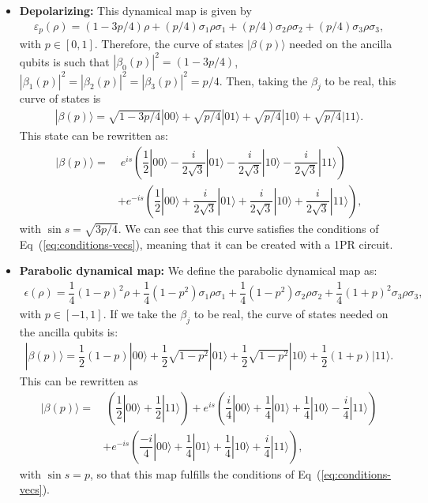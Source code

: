 \documentclass[10pt,letterpaper]{article} %
\newcommand{\eref}[1]{Eq~(\ref{#1})}
\begin{document}
\begin{itemize}
\item \textbf{Depolarizing:} This dynamical map is given by
\begin{align*}
\varepsilon_p(\rho) = (1-3p/4) \rho + (p/4) \sigma_1 \rho \sigma_1 + (p/4) \sigma_2 \rho \sigma_2 + (p/4) \sigma_3 \rho \sigma_3,
\end{align*}
with $p \in [0,1]$. 
Therefore, the curve of states $|\beta(p)\rangle$ needed on the ancilla
qubits is such that 
${|\beta_0(p)|}^2= (1-3p/4)$, ${|\beta_1(p)|}^2 = {|\beta_2(p)|}^2 = {|\beta_3(p)|}^2 = p/4$.
Then, taking the $\beta_j$ to be real,
this curve of states is 
\begin{align*}
|\beta(p) \rangle = \sqrt{1-3p/4} |00\rangle + \sqrt{p/4} |01\rangle + \sqrt{p/4} |10 \rangle  + \sqrt{p/4} |11\rangle.
\end{align*}
This state can be rewritten as:
\begin{align*}
|\beta(p)\rangle =& \; e^{is} \left( \dfrac{1}{2} |00\rangle - \dfrac{i}{2\sqrt{3}} |01\rangle 
      - \dfrac{i}{2\sqrt{3}} |10 \rangle - \dfrac{i}{2\sqrt{3}} |11\rangle \right) \\
& + e^{-is} \left( \dfrac{1}{2} |00\rangle + \dfrac{i}{2\sqrt{3}} |01\rangle 
      + \dfrac{i}{2\sqrt{3}} |10\rangle + \dfrac{i}{2\sqrt{3}} |11 \rangle \right),
\end{align*}
with $\sin s = \sqrt{3p/4}$.
We can see that this curve satisfies the conditions of \eref{eq:conditions-vecs}, meaning that it can be created with a 
1PR circuit.

\item \textbf{Parabolic dynamical map:} We define the parabolic dynamical map as:
\begin{eqnarray}
\epsilon(\rho) = \dfrac{1}{4} {(1-p)}^2  \rho + \dfrac{1}{4} (1-p^2) \sigma_1 \rho \sigma_1 + \dfrac{1}{4} (1-p^2) \sigma_2 \rho \sigma_2 + \dfrac{1}{4} {(1+p)}^2 \sigma_3 \rho \sigma_3 ,
\end{eqnarray}
with $p \in [-1,1]$. 
If we take the $\beta_j$ to be real,
the curve of states needed on the ancilla qubits is:
\begin{eqnarray}
|\beta(p)\rangle = \dfrac{1}{2} (1-p) |00\rangle + \dfrac{1}{2} \sqrt{1-p^2} |01\rangle +  \dfrac{1}{2} \sqrt{1-p^2} |10\rangle +  \dfrac{1}{2}(1+p) |11\rangle.
\end{eqnarray}
This can be rewritten as
\begin{align*}
|\beta(p)\rangle =&\; \left( \dfrac{1}{2}|00\rangle + \dfrac{1}{2} |11\rangle \right) + e^{is} \left( \dfrac{i}{4}|00\rangle + \dfrac{1}{4} |01\rangle + \dfrac{1}{4} |10\rangle - \dfrac{i}{4} |11\rangle \right) \\
& + e^{-is}  \left( \dfrac{-i}{4} |00\rangle + \dfrac{1}{4} |01\rangle + \dfrac{1}{4} |10\rangle + \dfrac{i}{4} |11\rangle \right),
\end{align*}
with $\sin s = p$, so that
this map fulfills the conditions of  \eref{eq:conditions-vecs}.



\end{itemize}
\end{document}

